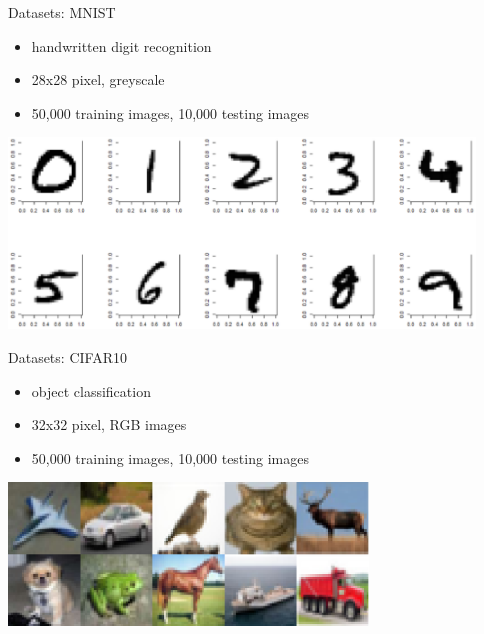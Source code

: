 \documentclass{beamer}
\begin{document}
  \begin{frame}{Datasets: MNIST}
    \begin{itemize}
      \item handwritten digit recognition
      \item 28x28 pixel, greyscale
      \item 50,000 training images, 10,000 testing images
    \end{itemize}
    \begin{center}
      \includegraphics[height=2in]{../figures/mnist.eps}
    \end{center}
  \end{frame}

  \begin{frame}{Datasets: CIFAR10}
    \begin{itemize}
      \item object classification
      \item 32x32 pixel, RGB images
      \item 50,000 training images, 10,000 testing images
    \end{itemize}
    \begin{center}
      \includegraphics[height=1.5in]{../figures/cifar.eps}
    \end{center}
  \end{frame}
\end{document}
